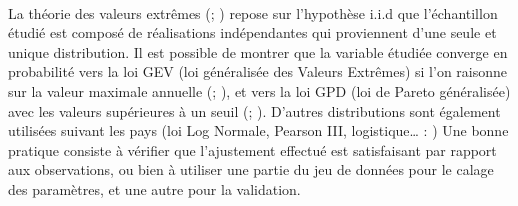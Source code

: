 	
	\paragraph{} La théorie des valeurs extrêmes (\cite{gumbel_statistics_1958}; \cite{coles_classical_2001}) repose sur l'hypothèse i.i.d que l'échantillon étudié est composé de réalisations indépendantes qui proviennent d'une seule et unique distribution. Il est possible de montrer que la variable étudiée converge en probabilité vers la loi GEV (loi généralisée des Valeurs Extrêmes) si l'on raisonne sur la valeur maximale annuelle (\cite{fisher_limiting_1928}; \cite{gnedenko_sur_1943}), et vers la loi GPD (loi de Pareto généralisée) avec les valeurs supérieures à un seuil (\cite{balkema_residual_1974}; \cite{pickands_statistical_1975}). D’autres distributions sont également utilisées suivant les pays (loi Log Normale, Pearson III, logistique… : \cite{whs_flood_2008}) Une bonne pratique consiste à vérifier que l'ajustement effectué est satisfaisant par rapport aux observations, ou bien à utiliser une partie du jeu de données pour le calage des paramètres, et une autre pour la validation.
	
